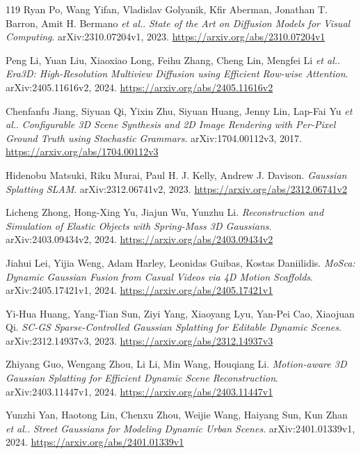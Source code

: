 \documentclass[11pt,a4paper]{article}
\begin{document}
\begin{thebibliography}{119}
Ryan Po, Wang Yifan, Vladislav Golyanik, Kfir Aberman, Jonathan T. Barron, Amit H. Bermano \emph{et al.}.
\newblock \emph{State of the Art on Diffusion Models for Visual Computing}.
\newblock arXiv:2310.07204v1, 2023.
\newblock \url{https://arxiv.org/abs/2310.07204v1}

Peng Li, Yuan Liu, Xiaoxiao Long, Feihu Zhang, Cheng Lin, Mengfei Li \emph{et al.}.
\newblock \emph{Era3D: High-Resolution Multiview Diffusion using Efficient Row-wise Attention}.
\newblock arXiv:2405.11616v2, 2024.
\newblock \url{https://arxiv.org/abs/2405.11616v2}

Chenfanfu Jiang, Siyuan Qi, Yixin Zhu, Siyuan Huang, Jenny Lin, Lap-Fai Yu \emph{et al.}.
\newblock \emph{Configurable 3D Scene Synthesis and 2D Image Rendering with Per-Pixel Ground Truth using Stochastic Grammars}.
\newblock arXiv:1704.00112v3, 2017.
\newblock \url{https://arxiv.org/abs/1704.00112v3}

Hidenobu Matsuki, Riku Murai, Paul H. J. Kelly, Andrew J. Davison.
\newblock \emph{Gaussian Splatting SLAM}.
\newblock arXiv:2312.06741v2, 2023.
\newblock \url{https://arxiv.org/abs/2312.06741v2}

Licheng Zhong, Hong-Xing Yu, Jiajun Wu, Yunzhu Li.
\newblock \emph{Reconstruction and Simulation of Elastic Objects with Spring-Mass 3D Gaussians}.
\newblock arXiv:2403.09434v2, 2024.
\newblock \url{https://arxiv.org/abs/2403.09434v2}

Jiahui Lei, Yijia Weng, Adam Harley, Leonidas Guibas, Kostas Daniilidis.
\newblock \emph{MoSca: Dynamic Gaussian Fusion from Casual Videos via 4D Motion Scaffolds}.
\newblock arXiv:2405.17421v1, 2024.
\newblock \url{https://arxiv.org/abs/2405.17421v1}

Yi-Hua Huang, Yang-Tian Sun, Ziyi Yang, Xiaoyang Lyu, Yan-Pei Cao, Xiaojuan Qi.
\newblock \emph{SC-GS Sparse-Controlled Gaussian Splatting for Editable Dynamic Scenes}.
\newblock arXiv:2312.14937v3, 2023.
\newblock \url{https://arxiv.org/abs/2312.14937v3}

Zhiyang Guo, Wengang Zhou, Li Li, Min Wang, Houqiang Li.
\newblock \emph{Motion-aware 3D Gaussian Splatting for Efficient Dynamic Scene Reconstruction}.
\newblock arXiv:2403.11447v1, 2024.
\newblock \url{https://arxiv.org/abs/2403.11447v1}

Yunzhi Yan, Haotong Lin, Chenxu Zhou, Weijie Wang, Haiyang Sun, Kun Zhan \emph{et al.}.
\newblock \emph{Street Gaussians for Modeling Dynamic Urban Scenes}.
\newblock arXiv:2401.01339v1, 2024.
\newblock \url{https://arxiv.org/abs/2401.01339v1}


\end{thebibliography}
\end{document}
